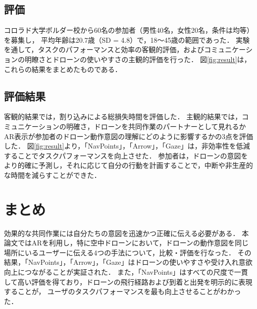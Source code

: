 \documentclass[a4paper,10pt,twocolumn,uplatex]{jsarticle}
\begin{document}
\subsection{評価}
コロラド大学ボルダー校から60名の参加者（男性40名，女性20名，条件は均等）を募集し，
平均年齢は20.7歳（SD = 4.8）で，18～45歳の範囲であった．
実験を通して，タスクのパフォーマンスと効率の客観的評価，およびコミュニケーションの明瞭さとドローンの使いやすさの主観的評価を行った．
図\ref{fig:result}は，これらの結果をまとめたものである．
\subsection{評価結果}
客観的結果では，割り込みによる総損失時間を評価した．
主観的結果では，コミュニケーションの明確さ，ドローンを共同作業のパートナーとして見れるか
AR表示が参加者のドローン動作意図の理解にどのように影響するかの3点を評価した．
図\ref{fig:result}より，「NavPoints」，「Arrow」，「Gaze」は，非効率性を低減することでタスクパフォーマンスを向上させた．
参加者は，ドローンの意図をより的確に予測し，それに応じて自分の行動を計画することで，中断や非生産的な時間を減らすことができた．


\section{まとめ}
効果的な共同作業には自分たちの意図を迅速かつ正確に伝える必要がある．
本論文ではARを利用し，特に空中ドローンにおいて，ドローンの動作意図を同じ場所にいるユーザーに伝える4つの手法について，比較・評価を行なった．
その結果，「NavPoints」，「Arrow」，「Gaze」はドローンの使いやすさや受け入れ意欲向上につながることが実証された．
また，「NavPoints」はすべての尺度で一貫して高い評価を得ており，ドローンの飛行経路および到着と出発を明示的に表現することが，
ユーザのタスクパフォーマンスを最も向上させることがわかった．



\end{document}
